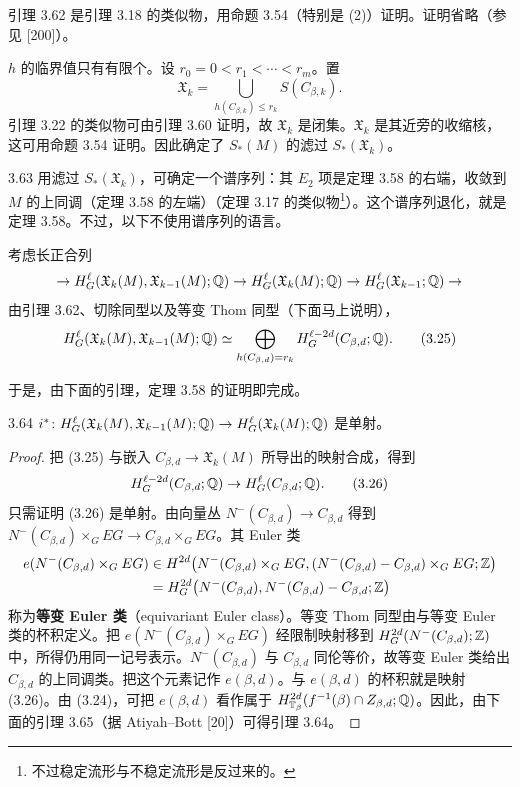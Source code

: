 引理 3.62 是引理 3.18 的类似物，用命题 3.54（特别是 (2)）证明。证明省略（参见 [200]）。

$h$ 的临界值只有有限个。设 $r_0=0<r_1<\cdots<r_m$。置
\[
  \mathfrak{X}_k=\bigcup_{h(C_{\beta,k})\le r_k}S(C_{\beta,k}).
\]
引理 3.22 的类似物可由引理 3.60 证明，故 $\mathfrak{X}_k$ 是闭集。$\mathfrak{X}_k$ 是其近旁的收缩核，这可用命题 3.54 证明。因此确定了 $S_*(M)$ 的滤过 $S_*(\mathfrak{X}_k)$。

\begin{remark}{3.63}
  用滤过 $S_*(\mathfrak{X}_k)$，可确定一个谱序列：其 $E_2$ 项是定理 3.58 的右端，收敛到 $M$ 的上同调（定理 3.58 的左端）（定理 3.17 的类似物\footnote{不过稳定流形与不稳定流形是反过来的。}）。这个谱序列退化，就是定理 3.58。不过，以下不使用谱序列的语言。
\end{remark}

考虑长正合列
\[
  \to H^\ell_G(\mathfrak{X}_k(M),\mathfrak{X}_{k-1}(M);\mathbb{Q})\to H^\ell_G(\mathfrak{X}_k(M);\mathbb{Q})
  \to H^\ell_G(\mathfrak{X}_{k-1};\mathbb{Q})\to
\]
由引理 3.62、切除同型以及等变 Thom 同型（下面马上说明），
\begin{equation}
  H^\ell_G(\mathfrak{X}_k(M),\mathfrak{X}_{k-1}(M);\mathbb{Q})
  \simeq\bigoplus_{h(C_{\beta,d})=r_k}H^{\ell-2d}_G(C_{\beta,d};\mathbb{Q}). \tag{3.25}
\end{equation}

于是，由下面的引理，定理 3.58 的证明即完成。

\begin{lemma*}{3.64}
  $i^*\colon H^\ell_G(\mathfrak{X}_k(M),\mathfrak{X}_{k-1}(M);\mathbb{Q})\to H^\ell_G(\mathfrak{X}_k(M);\mathbb{Q})$ 是单射。
\end{lemma*}

\begin{proof}
  把 (3.25) 与嵌入 $C_{\beta,d}\to\mathfrak{X}_k(M)$ 所导出的映射合成，得到
  \begin{equation}
    H^{\ell-2d}_G(C_{\beta,d};\mathbb{Q})\to H^\ell_G(C_{\beta,d};\mathbb{Q}). \tag{3.26}
  \end{equation}
  只需证明 (3.26) 是单射。由向量丛 $N^-(C_{\beta,d})\to C_{\beta,d}$ 得到 $N^-(C_{\beta,d})\times_GEG\to C_{\beta,d}\times_GEG$。其 Euler 类
  \begin{align*}
    e(N^-(C_{\beta,d})\times_GEG)
    &\in H^{2d}\bigl(N^-(C_{\beta,d})\times_GEG,(N^-(C_{\beta,d})-C_{\beta,d})\times_GEG;\mathbb{Z}\bigr)\\
    &=H^{2d}_G\bigl(N^-(C_{\beta,d}),N^-(C_{\beta,d})-C_{\beta,d};\mathbb{Z}\bigr)
  \end{align*}
  称为\textbf{等变 Euler 类}（equivariant Euler class）。等变 Thom 同型由与等变 Euler 类的杯积定义。把 $e(N^-(C_{\beta,d})\times_GEG)$ 经限制映射移到 $H^{2d}_G(N^-(C_{\beta,d});\mathbb{Z})$ 中，所得仍用同一记号表示。$N^-(C_{\beta,d})$ 与 $C_{\beta,d}$ 同伦等价，故等变 Euler 类给出 $C_{\beta,d}$ 的上同调类。把这个元素记作 $e(\beta,d)$。与 $e(\beta,d)$ 的杯积就是映射 (3.26)。由 (3.24)，可把 $e(\beta,d)$ 看作属于 $H^{2d}_{\mathbb{T}_\beta}(f^{-1}(\beta)\cap Z_{\beta,d};\mathbb{Q})$。因此，由下面的引理 3.65（据 Atiyah–Bott [20]）可得引理 3.64。
\end{proof}

